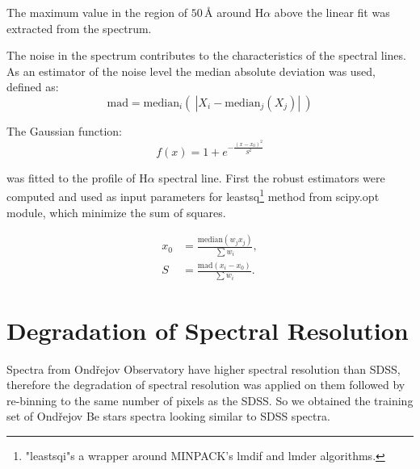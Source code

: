 \documentclass[11pt,twoside]{article}
\begin{document}
The maximum value in the region of $50\,\textrm{\AA}$ around H$\alpha$
above the linear fit was extracted from the spectrum.


The noise in the spectrum contributes to the characteristics of the
spectral lines. As an estimator of the noise level the median
absolute deviation was used, defined as:
%
\begin{equation}
  \textrm{mad} = \textrm{median}_{i}\left(\ \left| X_{i} -
      \textrm{median}_{j} (X_{j}) \right|\ \right)
\end{equation}
%

\noindent The Gaussian function:
%
\begin{equation}
  \label{eq:gauss2}
  f(x) =  1 + e^{- { \frac{(x-x_0)^2 }{ S^2} } }
\end{equation}
%

\noindent was fitted to the profile of H$\alpha$ spectral line. First the robust
estimators were computed and used as input parameters for
leastsq\footnote{"leastsqi"s a wrapper around MINPACK’s lmdif and
  lmder algorithms.} method from scipy.opt module, which minimize the
sum of squares.

\begin{eqnarray}
  x_0 & = \frac{\textrm{median}(w_jx_j)}{\sum{w_i}}, \\
  S & = \frac{\textrm{mad}(x_i - x_0)}{\sum{w_i}}.
\end{eqnarray}




%
%




\section{Degradation of Spectral Resolution}

Spectra from Ond\v{r}ejov Observatory have higher spectral resolution
than SDSS, therefore the degradation of spectral resolution was
applied on them followed by re-binning to the same number of pixels as the
SDSS. So we obtained the training set of Ond\v{r}ejov Be stars spectra looking
similar to  SDSS spectra.
\end{document}
